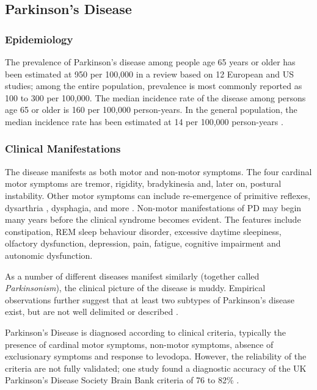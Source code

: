 \subsection{Parkinson's Disease}
\subsubsection{Epidemiology}
The prevalence of Parkinson's disease among people age 65 years or older has been estimated at 950 per 100,000 in a review based on 12 European and US studies; among the entire population, prevalence is most commonly reported as 100 to 300 per 100,000.
The median incidence rate of the disease among persons age 65 or older is 160 per 100,000 person-years. In the general population, the median incidence rate has been estimated at 14 per 100,000 person-years \cite{Wirdefeldt2011}.

\subsubsection{Clinical Manifestations}
The disease manifests as both motor and non-motor symptoms. The four cardinal motor symptoms are tremor, rigidity, bradykinesia and, later on, postural instability. Other motor symptoms can include re-emergence of primitive reflexes, dysarthria%
, dysphagia, and more \cite{Jankovic2008}. 
Non-motor manifestations of PD may begin many years before the clinical syndrome becomes evident. The features include constipation, REM sleep behaviour disorder, excessive daytime sleepiness, olfactory dysfunction, depression, pain, fatigue, cognitive impairment and autonomic dysfunction.%

As a number of different diseases manifest similarly (together called \textit{Parkinsonism}), the clinical picture of the disease is muddy. Empirical observations further suggest that at least two subtypes of Parkinson's disease exist, but are not well delimited or described \cite{Kalia2015}. 


Parkinson's Disease is diagnosed according to clinical criteria, typically the presence of cardinal motor symptoms, non-motor symptoms, absence of exclusionary symptoms and response to levodopa. However, the reliability of the criteria are not fully validated; one study found a diagnostic accuracy of the UK Parkinson’s Disease Society Brain Bank criteria of 76 to 82\% \cite{Jankovic2008}. 


